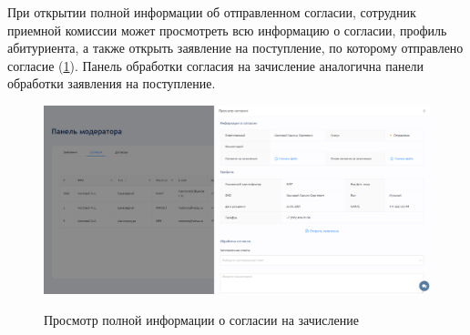 При открытии полной информации об отправленном согласии, сотрудник приемной комиссии может просмотреть всю информацию о согласии, профиль абитуриента, а также открыть заявление на поступление, по которому отправлено согласие (\ref{fig:moderatoragree}). Панель обработки согласия на зачисление аналогична панели обработки заявления на поступление.

\begin{figure}[H]
\begin{center}
\includegraphics[width=1\hsize]{fig/moderator-agree.png}\\[2mm]
\caption{Просмотр полной информации о согласии на зачисление}\label{fig:moderatoragree}
\end{center}
\end{figure}